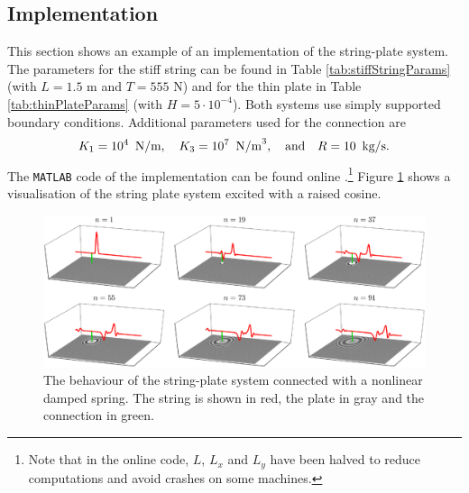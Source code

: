 \subsection{Implementation}\label{sec:implementationStringPlate}
This section shows an example of an implementation of the string-plate system. The parameters for the stiff string can be found in Table \ref{tab:stiffStringParams} (with $L = 1.5$ m and $T = 555$ N) and for the thin plate in Table \ref{tab:thinPlateParams} (with $H=5\cdot10^{-4}$). Both systems use simply supported boundary conditions. Additional parameters used for the connection are
\begin{equation*}
    K_1 = 10^4\ \,\text{N/m}, \quad K_3 = 10^7\ \,\text{N/m}^3, \qaq R = 10\ \,\text{kg/s}.
\end{equation*}
The \texttt{MATLAB} code of the implementation can be found online \cite{stringPlateGist}.\footnote{Note that in the online code, $L$, $L_x$ and $L_y$ have been halved to reduce computations and avoid crashes on some machines.}  Figure \ref{fig:stringPlate} shows a visualisation of the string plate system excited with a raised cosine. 
\begin{figure}[h]
    \centering
    \includegraphics[width=\textwidth]{figures/interactions/stringPlate.eps}
    \caption{The behaviour of the string-plate system connected with a nonlinear damped spring. The string is shown in red, the plate in gray and the connection in green. \label{fig:stringPlate}}
\end{figure}

